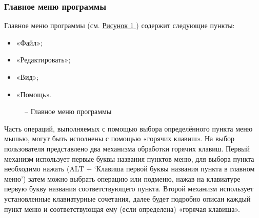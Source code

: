 \documentclass[letterpaper,10pt,russian]{sphinxmanual}
\begin{document}
\subsubsection{Главное меню программы}
\label{usage_guide/ide_components:id1}
Главное меню программы (см. \hyperref[usage_guide/ide_components:image2]{Рисунок \ref{usage_guide/ide_components:image2} }) содержит следующие пункты:
\begin{itemize}
\item {} 
«Файл»;

\item {} 
«Редактировать»;

\item {} 
«Вид»;

\item {} 
«Помощь».

\end{itemize}
\begin{figure}[htbp]
\centering
\capstart

\noindent{}
\caption{– Главное меню программы}\label{usage_guide/ide_components:image2}\end{figure}

Часть операций, выполняемых с помощью выбора определённого пункта меню
мышью, могут быть исполнены с помощью «горячих клавиш». На выбор
пользователя представлено два механизма обработки горячих клавиш. Первый
механизм использует первые буквы названия пунктов меню, для выбора
пункта необходимо нажать (ALT + ‘Клавиша первой буквы названия пункта в
главном меню’) затем можно выбрать операцию или подменю, нажав на
клавиатуре первую букву названия соответствующего пункта. Второй
механизм использует установленные клавиатурные сочетания, далее будет
подробно описан каждый пункт меню и соответствующая ему (если
определена) «горячая клавиша».
\end{document}
